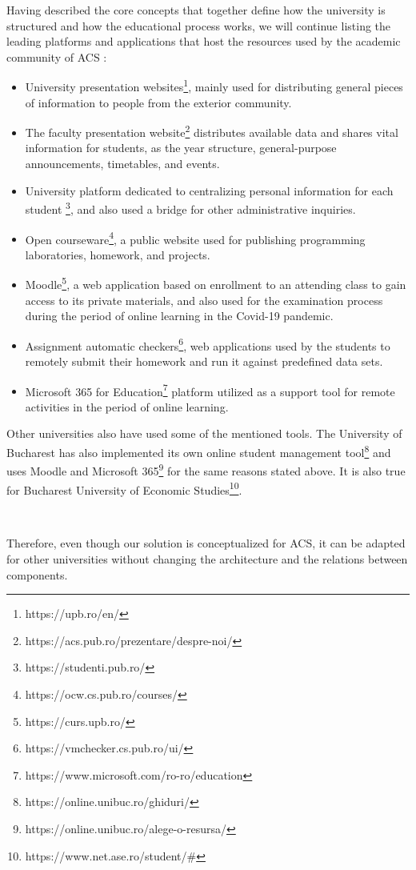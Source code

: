 Having described the core concepts that together define how the university is structured and how the educational process works, we will continue listing the leading platforms and applications that host the resources used by the academic community of ACS :
\begin{itemize}
            \setlength{\topsep}{0.5pt}
            \setlength{\itemsep}{0.5pt}
            \setlength{\parsep}{0.5pt}
            \item University presentation websites\footnote{https://upb.ro/en/}, mainly used for distributing general pieces of information to people from the exterior community.
            \item The faculty presentation website\footnote{https://acs.pub.ro/prezentare/despre-noi/} distributes available data and shares vital information for students, as the year structure, general-purpose announcements, timetables, and events. 
            \item University platform dedicated to centralizing personal information for each student \footnote{https://studenti.pub.ro/}, and also used a bridge for other administrative inquiries. 
            \item Open courseware\footnote{https://ocw.cs.pub.ro/courses/}, a public website used for publishing programming laboratories, homework, and projects.
            \item Moodle\footnote{https://curs.upb.ro/}, a web application based on enrollment to an attending class to gain access to its private materials, and also used for the examination process during the period of online learning in the Covid-19 pandemic.
            \item Assignment automatic checkers\footnote{https://vmchecker.cs.pub.ro/ui/}, web applications used by the students to remotely submit their homework and run it against predefined data sets. 
            \item Microsoft 365 for Education\footnote{https://www.microsoft.com/ro-ro/education} platform utilized as a support tool for remote activities in the period of online learning.
\end{itemize}

Other universities also have used some of the mentioned tools. The University of Bucharest has also implemented its own online student management tool\footnote{https://online.unibuc.ro/ghiduri/} and uses Moodle and Microsoft 365\footnote{https://online.unibuc.ro/alege-o-resursa/} for the same reasons stated above. 
It is also true for Bucharest University of Economic Studies\footnote{https://www.net.ase.ro/student/\#}.
 
~
 
Therefore, even though our solution is conceptualized for ACS, it can be adapted for other universities without changing the architecture and the relations between components.   
